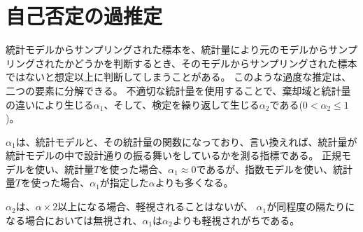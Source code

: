    


\section{自己否定の過推定}
統計モデルからサンプリングされた標本を、統計量により元のモデルからサンプリングされたかどうかを判断するとき、そのモデルからサンプリングされた標本ではないと想定以上に判断してしまうことがある。
このような過度な推定は、二つの要素に分解できる。
不適切な統計量を使用することで、棄却域と統計量の違いにより生じる$\alpha_1$、そして、検定を繰り返して生じる$\alpha_2$である($0<\alpha_2 \leq 1$)。

$\alpha_1$は、統計モデルと、その統計量の関数になっており、言い換えれば、統計量が統計モデルの中で設計通りの振る舞いをしているかを測る指標である。
正規モデルを使い、統計量$T$を使った場合、$\alpha_1 \approx	 0 $であるが、指数モデルを使い、統計量$T$を使った場合、$\alpha_1$が指定した$\alpha$よりも多くなる。

$\alpha_2$は、$\alpha\times 2$以上になる場合、軽視されることはないが、
$\alpha_1$が同程度の隔たりになる場合においては無視され、$\alpha_1$は$\alpha_2$よりも軽視されがちである。







